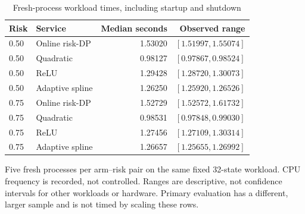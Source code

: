 \begin{table}[htbp]
\caption{Fresh-process workload times, including startup and shutdown}\label{tab:timing96}
\centering\small\begin{tabular}{l l r r}\toprule
Risk & Service & Median seconds & Observed range\\
\midrule
0.50 & Online risk-DP & 1.53020 & $[1.51997,1.55074]$ \\
0.50 & Quadratic & 0.98127 & $[0.97867,0.98524]$ \\
0.50 & ReLU & 1.29428 & $[1.28720,1.30073]$ \\
0.50 & Adaptive spline & 1.26250 & $[1.25920,1.26526]$ \\
0.75 & Online risk-DP & 1.52729 & $[1.52572,1.61732]$ \\
0.75 & Quadratic & 0.98531 & $[0.97848,0.99030]$ \\
0.75 & ReLU & 1.27456 & $[1.27109,1.30314]$ \\
0.75 & Adaptive spline & 1.26657 & $[1.25655,1.26992]$ \\
\bottomrule\end{tabular}
\par\smallskip\parbox{.97\linewidth}{\footnotesize Five fresh processes per arm--risk pair on the same fixed 32-state workload. CPU frequency is recorded, not controlled. Ranges are descriptive, not confidence intervals for other workloads or hardware. Primary evaluation has a different, larger sample and is not timed by scaling these rows.}
\end{table}

